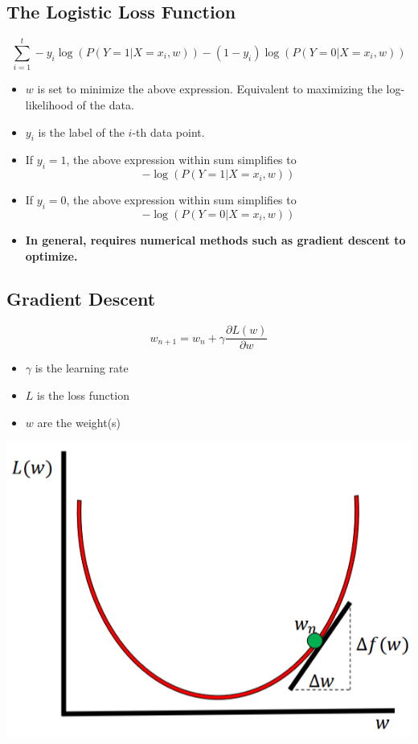\documentclass[10pt]{article}
\begin{document}
\subsection*{The Logistic Loss Function}
\[\sum_{i = 1}^t - y_i \log(P(Y = 1|X = x_i, w)) - (1 - y_i) \log(P(Y = 0|X = x_i, w))\]
\begin{itemize}
	\item $w$ is set to minimize the above expression.  Equivalent to maximizing the log-likelihood of the data.
	\item $y_i$ is the label of the $i$-th data point.
	\item If $y_i = 1$, the above expression within sum simplifies to 
	\[-\log(P(Y = 1 | X = x_i, w))\]
    \item If $y_i = 0$, the above expression within sum simplifies to
    \[-\log(P(Y = 0 | X = x_i, w))\]
    \item \textbf{In general, requires numerical methods such as gradient descent to optimize.}
\end{itemize}

\subsection*{Gradient Descent}
\[w_{n + 1} = w_n + \gamma \frac{\partial L(w)}{\partial w}\]
\begin{itemize}
	\item $\gamma$ is the learning rate
	\item $L$ is the loss function
	\item $w$ are the weight(s)
\end{itemize}
\begin{center} 
	\includegraphics*[scale=0.8]{W8_11.png} 
\end{center}
\end{document}
